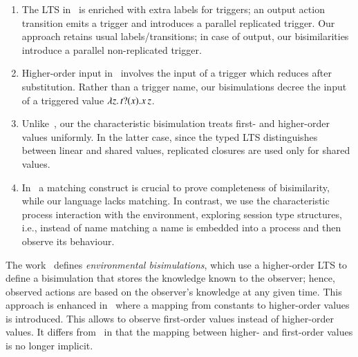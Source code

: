 \begin{enumerate}[$\bullet$]
\item 
The LTS in~\cite{JeffreyR05} is enriched with extra labels for triggers;
an output action transition emits a trigger and introduces a parallel replicated trigger.
Our 
approach retains usual labels/transitions; in  case of output,
our bisimilarities introduce a parallel
non-replicated trigger.
\item Higher-order input in~\cite{JeffreyR05} involves 
the input of a trigger which reduces after substitution.
Rather than a trigger name, our bisimulations  
decree the input of a triggered value $\lambda z.\,t ? (x) . x\,z$.
\item Unlike~\cite{JeffreyR05}, 
our the characteristic bisimulation treats  
first- and higher-order values uniformly. In the latter case, 
since the typed LTS distinguishes between linear and shared values, 
replicated closures are used only for shared values.

\item In~\cite{JeffreyR05} a matching construct is
crucial to prove completeness of bisimilarity,
while our language lacks matching. 
In contrast, 
we use the characteristic
process interaction with the environment, exploring 
session type structures, i.e., instead of
name matching a name is embedded into a process and then observe its behaviour.

\end{enumerate}

The work~\cite{DBLP:conf/lics/SangiorgiKS07} defines \emph{environmental bisimulations},
which 
use a higher-order LTS 
to define a bisimulation that stores the knowledge known to
the observer; hence, observed actions are based on the observer's knowledge
at any given time. This approach is enhanced in~\cite{DBLP:journals/cl/KoutavasH12,DBLP:conf/esop/KoutavasH11}
where a mapping from constants to higher-order values is introduced. This 
allows to observe first-order values instead
of higher-order values. It differs from~\cite{San96H,JeffreyR05} in that 
the mapping between higher- and first-order values is no longer implicit.


